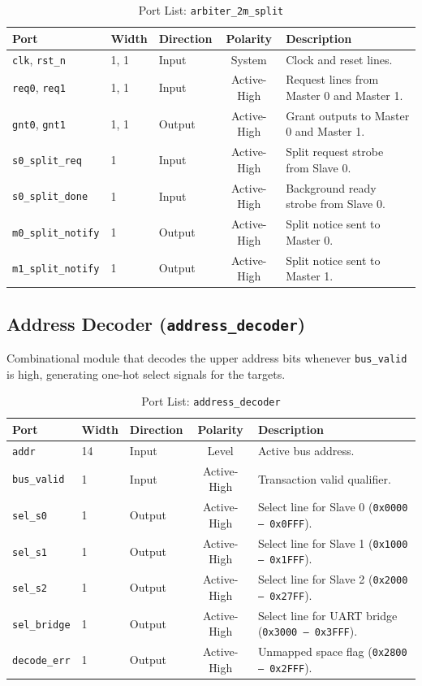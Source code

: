 \documentclass[11pt,a4paper]{article}
\begin{document}
\begin{table}[h!]
\centering
\caption{Port List: \texttt{arbiter\_2m\_split}}
\small
\begin{tabularx}{\textwidth}{lllcX}
\toprule
\textbf{Port} & \textbf{Width} & \textbf{Direction} & \textbf{Polarity} & \textbf{Description} \\
\midrule
\texttt{clk}, \texttt{rst\_n} & 1, 1 & Input & System & Clock and reset lines. \\
\texttt{req0}, \texttt{req1} & 1, 1 & Input & Active-High & Request lines from Master 0 and Master 1. \\
\texttt{gnt0}, \texttt{gnt1} & 1, 1 & Output & Active-High & Grant outputs to Master 0 and Master 1. \\
\texttt{s0\_split\_req} & 1 & Input & Active-High & Split request strobe from Slave 0. \\
\texttt{s0\_split\_done} & 1 & Input & Active-High & Background ready strobe from Slave 0. \\
\texttt{m0\_split\_notify} & 1 & Output & Active-High & Split notice sent to Master 0. \\
\texttt{m1\_split\_notify} & 1 & Output & Active-High & Split notice sent to Master 1. \\
\bottomrule
\end{tabularx}
\end{table}

\subsection{Address Decoder (\texttt{address\_decoder})}
Combinational module that decodes the upper address bits whenever \texttt{bus\_valid} is high, generating one-hot select signals for the targets.

\begin{table}[h!]
\centering
\caption{Port List: \texttt{address\_decoder}}
\small
\begin{tabularx}{\textwidth}{lllcX}
\toprule
\textbf{Port} & \textbf{Width} & \textbf{Direction} & \textbf{Polarity} & \textbf{Description} \\
\midrule
\texttt{addr} & 14 & Input & Level & Active bus address. \\
\texttt{bus\_valid} & 1 & Input & Active-High & Transaction valid qualifier. \\
\texttt{sel\_s0} & 1 & Output & Active-High & Select line for Slave 0 (\texttt{0x0000 -- 0x0FFF}). \\
\texttt{sel\_s1} & 1 & Output & Active-High & Select line for Slave 1 (\texttt{0x1000 -- 0x1FFF}). \\
\texttt{sel\_s2} & 1 & Output & Active-High & Select line for Slave 2 (\texttt{0x2000 -- 0x27FF}). \\
\texttt{sel\_bridge} & 1 & Output & Active-High & Select line for UART bridge (\texttt{0x3000 -- 0x3FFF}). \\
\texttt{decode\_err} & 1 & Output & Active-High & Unmapped space flag (\texttt{0x2800 -- 0x2FFF}). \\
\bottomrule
\end{tabularx}
\end{table}
\end{document}
